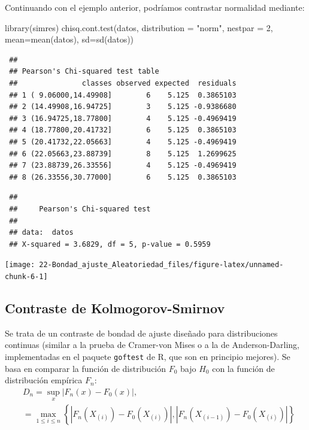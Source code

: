 \documentclass[
]{book}
\newenvironment{Shaded}{\begin{snugshade}}{\end{snugshade}}
\newcommand{\AttributeTok}[1]{\textcolor[rgb]{0.77,0.63,0.00}{#1}}
\newcommand{\DecValTok}[1]{\textcolor[rgb]{0.00,0.00,0.81}{#1}}
\newcommand{\FunctionTok}[1]{\textcolor[rgb]{0.00,0.00,0.00}{#1}}
\newcommand{\NormalTok}[1]{#1}
\newcommand{\StringTok}[1]{\textcolor[rgb]{0.31,0.60,0.02}{#1}}
\theoremstyle{break}
\theoremstyle{nonumberplain}
\begin{document}
Continuando con el ejemplo anterior, podríamos contrastar normalidad mediante:

\begin{Shaded}
\begin{Highlighting}[]
\FunctionTok{library}\NormalTok{(simres)}
\FunctionTok{chisq.cont.test}\NormalTok{(datos, }\AttributeTok{distribution =} \StringTok{"norm"}\NormalTok{, }\AttributeTok{nestpar =} \DecValTok{2}\NormalTok{, }\AttributeTok{mean=}\FunctionTok{mean}\NormalTok{(datos), }\AttributeTok{sd=}\FunctionTok{sd}\NormalTok{(datos))}
\end{Highlighting}
\end{Shaded}

\begin{verbatim}
 ## 
 ## Pearson's Chi-squared test table
 ##               classes observed expected  residuals
 ## 1 ( 9.06000,14.49908]        6    5.125  0.3865103
 ## 2 (14.49908,16.94725]        3    5.125 -0.9386680
 ## 3 (16.94725,18.77800]        4    5.125 -0.4969419
 ## 4 (18.77800,20.41732]        6    5.125  0.3865103
 ## 5 (20.41732,22.05663]        4    5.125 -0.4969419
 ## 6 (22.05663,23.88739]        8    5.125  1.2699625
 ## 7 (23.88739,26.33556]        4    5.125 -0.4969419
 ## 8 (26.33556,30.77000]        6    5.125  0.3865103
\end{verbatim}

\begin{verbatim}
 ## 
 ##     Pearson's Chi-squared test
 ## 
 ## data:  datos
 ## X-squared = 3.6829, df = 5, p-value = 0.5959
\end{verbatim}

\begin{center}\texttt{[image: 22-Bondad\_ajuste\_Aleatoriedad\_files/figure-latex/unnamed-chunk-6-1]} \end{center}

\hypertarget{ks-test}{%
\subsection{Contraste de Kolmogorov-Smirnov}\label{ks-test}}

Se trata de un contraste de bondad de ajuste diseñado para distribuciones continuas
(similar a la prueba de Cramer-von Mises o a la de Anderson-Darling, implementadas en el paquete \texttt{goftest} de R, que son en principio mejores).
Se basa en comparar la función de distribución \(F_0\) bajo \(H_0\) con la función de distribución empírica \(F_n\):
\[\begin{aligned}
& D_n=\sup_{x}|F_n(x)-F_0(x)|,\\
& = \max_{1 \leq i \leq n} \left\{ |F_n(X_{(i)})-F_0(X_{(i)})|,|F_n(X_{(i-1)})-F_0(X_{(i)})| \right\}
\end{aligned}\]
\end{document}
